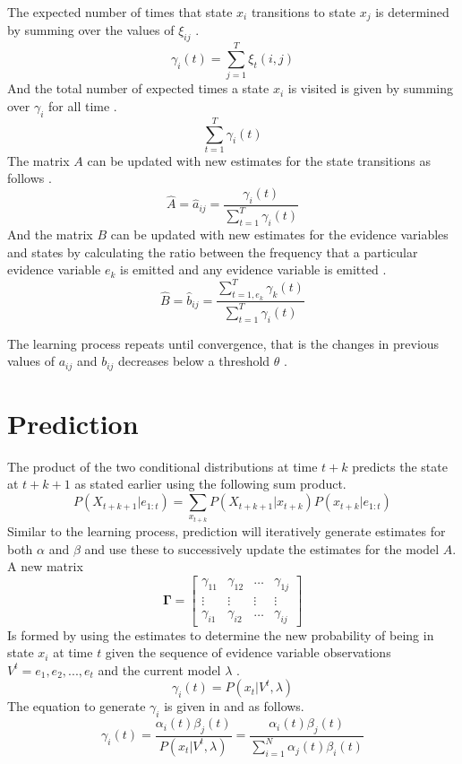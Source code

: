 \documentclass[11pt]{article}
\begin{document}
The expected number of times that state $x_i$ transitions to state $x_j$ is determined by summing over the values of $\xi_{ij}$ \cite{pc} \cite{rab}.
$$
\gamma_i(t) = \sum_{j=1}^T \xi_t(i,j)
$$
And the total number of expected times a state $x_i$ is visited is given by summing over $\gamma_i$ for all time \cite{pc} \cite{rab}.
$$
\sum_{t=1}^T \gamma_i(t)
$$
The matrix $A$ can be updated with new estimates for the state transitions as follows \cite{pc}.
$$
\hat{A} = \hat{a}_{ij} = \frac{\gamma_i(t) }{\sum_{t=1}^T \gamma_i(t)}
$$
And the matrix $B$ can be updated with new estimates for the evidence variables and states by calculating the ratio between the frequency that a particular evidence variable $e_k$ is emitted and any evidence variable is emitted \cite{pc}.
$$
\hat{B} = \hat{b}_{ij} = \frac{\sum_{t=1, e_k}^T \gamma_k(t)}{\sum_{t=1}^T \gamma_i(t)}
$$ 

The learning process repeats until convergence, that is the changes in previous values of $a_{ij}$ and $b_{ij}$ decreases below a threshold $\theta$ \cite{pc}. 

\section{Prediction}

The product of the two conditional distributions at time $t+k$ predicts the state at $t+k+1$ as stated earlier using the following sum product.
$$
P(X_{t+k+1}|e_{1:t}) = \sum_{ x_{t+k} } P(X_{t+k+1} | x_{t+k}) P(x_{t+k}|e_{1:t}) 
$$
Similar to the learning process, prediction will iteratively generate estimates for both $\alpha$ and $\beta$ and use these to successively update the estimates for the model $A$. A new matrix 
\begin{equation*}
 \mathbf{\Gamma} = \left[
    \begin{array}{cccc}
    \gamma_{11} & \gamma_{12} & \ldots & \gamma_{1j} \\
    \vdots & \vdots & \vdots & \vdots \\
    \gamma_{i1} & \gamma_{i2} & \ldots & \gamma_{ij}
    \end{array}
    \right]
\end{equation*}
Is formed by using the estimates to determine the new probability of being in state $x_i$ at time $t$ given the sequence of evidence variable observations $V^t = e_1,e_2,...,e_t$ and the current model $\lambda$ \cite{rab}.
$$
\gamma_i(t) = P(x_t | V^t, \lambda)
$$
The equation to generate $\gamma_i$ is given in \cite{rab} and \cite{pc} as follows.
$$
\gamma_i(t) = \frac{\alpha_i(t)\beta_j(t)}{P(x_t | V^t, \lambda)} = \frac{\alpha_i(t)\beta_j(t)}{\sum_{i=1}^N \alpha_j(t)\beta_i(t)}
$$
\end{document}
